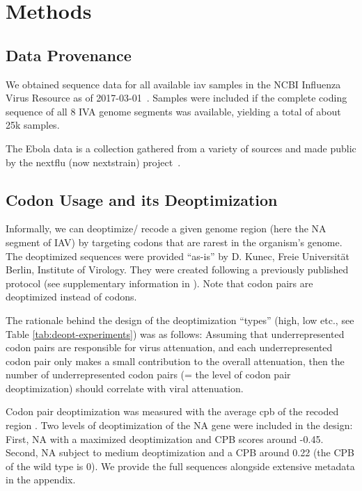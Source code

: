 \section{Methods}

\subsection{Data Provenance}

We obtained sequence data for all available \gls{iav} samples in the NCBI Influenza Virus Resource as of 2017-03-01~\cite{Bao2008-kb}. Samples were included if the complete coding sequence of all 8 IVA genome segments was available, yielding a total of about 25k samples.

The Ebola data is a collection gathered from a variety of sources and made public by the nextflu (now nextstrain) project~\cite{Neher2015-vn}.


\subsection{Codon Usage and its Deoptimization}

Informally, we can deoptimize/ recode a given genome region (here the NA segment of IAV) by targeting codons that are rarest in the organism's genome. The deoptimized sequences were provided ``as-is'' by D. Kunec, Freie Universität Berlin, Institute of Virology. They were created following a previously published protocol (see supplementary information in \cite{Coleman2008-nm}). Note that codon pairs are deoptimized instead of codons.

The rationale behind the design of the deoptimization ``types'' (high, low etc., see Table \ref{tab:deopt-experiments}) was as follows: Assuming that underrepresented codon pairs are responsible for virus attenuation, and each underrepresented codon pair only makes a small contribution to the overall attenuation, then the number of underrepresented codon pairs (= the level of codon pair deoptimization) should correlate with viral attenuation.

Codon pair deoptimization was measured with the average \gls{cpb} of the recoded region \cite{Mueller2006-fz, Coleman2008-nm}. Two levels of deoptimization of the NA gene were included in the design: First, NA with a maximized deoptimization and CPB scores around -0.45. Second, NA subject to medium deoptimization and a CPB around 0.22 (the CPB of the wild type is 0). We provide the full sequences alongside extensive metadata in the appendix.



